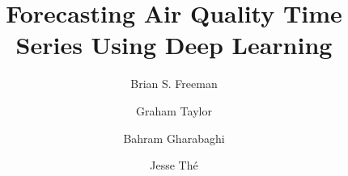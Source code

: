 \documentclass[preprint,12pt,authoryear]{elsarticle}
\title{Forecasting Air Quality Time Series Using Deep Learning}
\begin{document}
\maketitle

\begin{linenumbers}
\begin{frontmatter}

\author[guelph]{Brian S. Freeman}

\author[guelph]{Graham Taylor}

\author[guelph]{Bahram Gharabaghi}

\author[lakes]{Jesse Th\'e }


\address[guelph]{School of Engineering, University of Guelph, Guelph, Ontario, N1G 2W1, Canada}
\address[lakes]{Lakes Environmental, 170 Columbia St W, Waterloo, Ontario, N2L 3L3 Canada}



\end{frontmatter}
\end{linenumbers}
\end{document}
